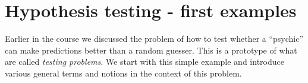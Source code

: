 \documentclass[preprint,  11pt]{amsart}
\def\sig{{\sigma}}
\renewcommand\phi{{\varphi}}
\renewcommand{\benu}{\begin{enumerate}\setlength\itemsep{6pt}}
\renewcommand{\bex}{\indent\begin{exercise}}
\begin{document}


\section{Hypothesis testing - first examples}
Earlier in the course we discussed the problem of how to test whether a ``psychic'' can make predictions better than a random guesser. This is a prototype of what are called {\em testing problems}. We start with this simple example and introduce various general terms and notions in the context of this problem.
\end{document}
